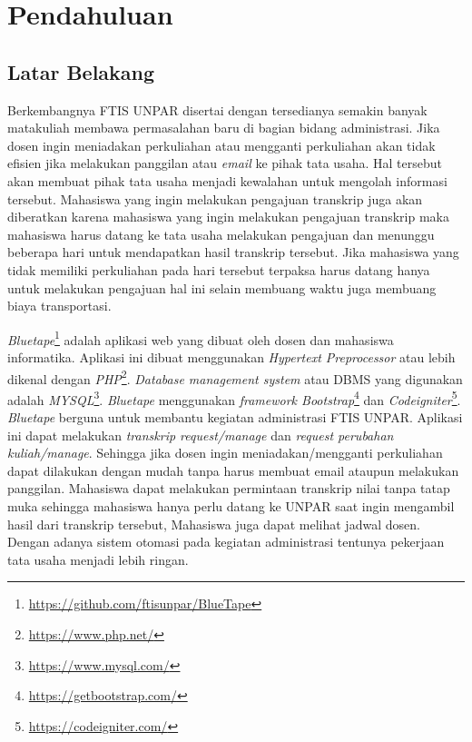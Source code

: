 \chapter{Pendahuluan}
\label{chap:intro}
   
\section{Latar Belakang}
\label{sec:label}
 Berkembangnya FTIS UNPAR disertai dengan tersedianya semakin banyak matakuliah membawa permasalahan baru di bagian bidang administrasi. Jika dosen ingin meniadakan perkuliahan atau mengganti perkuliahan akan tidak efisien jika melakukan panggilan atau \textit{email} ke pihak tata usaha. Hal tersebut akan membuat pihak tata usaha menjadi kewalahan untuk mengolah informasi tersebut. Mahasiswa yang ingin melakukan pengajuan transkrip juga akan diberatkan karena mahasiswa yang ingin melakukan pengajuan transkrip maka mahasiswa harus datang ke tata usaha melakukan pengajuan dan menunggu beberapa hari untuk mendapatkan hasil transkrip tersebut. Jika mahasiswa yang tidak memiliki perkuliahan pada hari tersebut terpaksa harus datang hanya untuk melakukan pengajuan hal ini selain membuang waktu juga membuang biaya transportasi.


\textit{Bluetape}\footnote{\label{ft:bluetape}\url{https://github.com/ftisunpar/BlueTape}} adalah aplikasi web yang dibuat oleh dosen dan mahasiswa informatika. Aplikasi ini dibuat menggunakan \textit{Hypertext Preprocessor} atau lebih dikenal dengan \textit{PHP}\footnote{\url{https://www.php.net/}}. \textit{Database management system} atau DBMS yang digunakan adalah \textit{MYSQL}\footnote{\url{https://www.mysql.com/}}.\textit{ Bluetape} menggunakan \textit{framework Bootstrap}\footnote{\url{https://getbootstrap.com/}} dan \textit{Codeigniter}\footnote{\url{https://codeigniter.com/}}. \textit{ Bluetape} berguna untuk membantu kegiatan administrasi FTIS UNPAR. Aplikasi ini dapat melakukan \textit{transkrip request/manage} dan \textit{request perubahan kuliah/manage}. Sehingga jika dosen ingin meniadakan/mengganti perkuliahan dapat dilakukan dengan mudah tanpa harus membuat email ataupun melakukan panggilan. Mahasiswa dapat melakukan permintaan transkrip nilai tanpa tatap muka sehingga mahasiswa hanya perlu datang ke UNPAR saat ingin mengambil hasil dari transkrip tersebut, Mahasiswa juga dapat melihat jadwal dosen. Dengan adanya sistem otomasi pada kegiatan administrasi tentunya pekerjaan tata usaha menjadi lebih ringan.


